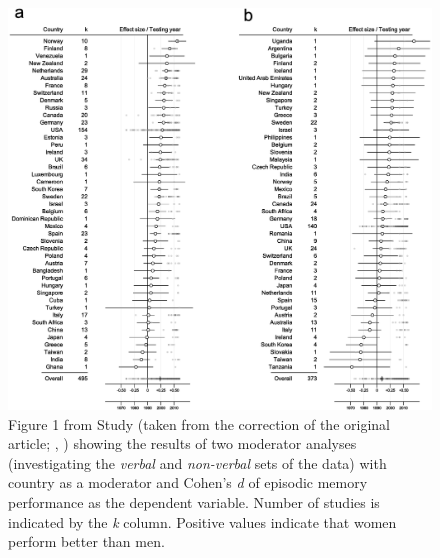 \begin{figure} \centering \includegraphics[width=120mm]{./Figures/Study3_Figure1.eps} \caption{Figure 1 from Study  (taken from the correction of the original article; \citeauthor{Asperholm2019c}, \citeyear{Asperholm2019c}) showing the results of two moderator analyses (investigating the \emph{verbal} and \emph{non-verbal} sets of the data) with country as a moderator and Cohen's \emph{d} of episodic memory performance as the dependent variable. Number of studies is indicated by the \emph{k} column. Positive values indicate that women perform better than men.} \label{Figure:Study3_Figure1} \end{figure}

